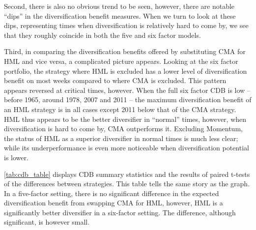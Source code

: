 Second, there is also no obvious trend to be seen, however, there are notable ``dips'' in the diversification benefit measures. When we turn to look at these dips, representing times when diversification is relatively hard to come by, we see that they roughly coincide in both the five and six factor models.

Third, in comparing the diversification benefits offered by substituting CMA for HML and vice versa, a complicated picture appears. Looking at the six factor portfolio, the strategy where HML is excluded has a lower level of diversification benefit on most weeks compared to where CMA is excluded. This pattern appears reversed at critical times, however. When the full six factor CDB is low -- before 1965, around 1978, 2007 and 2011 -- the maximum diversification benefit of an HML strategy is in all cases except 2011 below that of the CMA strategy. HML thus appears to be the better diversifier in ``normal'' times, however, when diversification is hard to come by, CMA outperforms it. Excluding Momentum, the status of HML as a superior diversifier in normal times is much less clear; while its underperformance is even more noticeable when diversification potential is lower.

\autoref{tab:cdb_table} displays CDB summary statistics and the results of paired t-tests of the differences between strategies. This table tells the same story as the graph. In a five-factor setting, there is no significant difference in the expected diversification benefit from swapping CMA for HML, however, HML is a significantly better diversifier in a six-factor setting. The difference, although significant, is however small.






